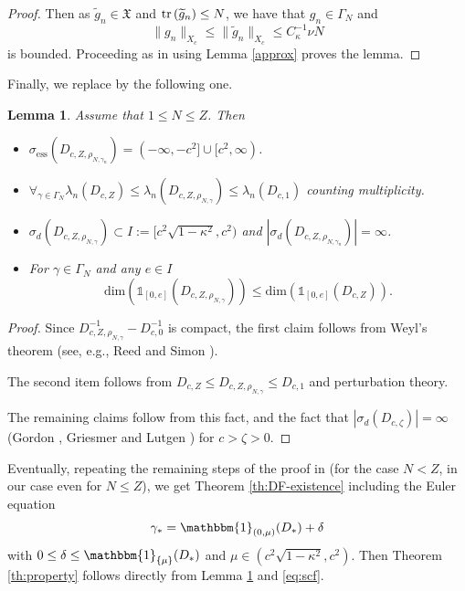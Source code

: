 \documentclass[a4paper]{amsart}
\newtheorem{lemma}{Lemma}
\def\tr{{\rm tr \,}}
\def\1{{\mathds{1}}}
\def\gX{\mathfrak{X}}
\begin{document}
\begin{proof}
Then as $\widetilde{g}_n\in\gX$ and $\tr(\widetilde{g}_n)\leq N$, we
have that $g_n \in \Gamma_{N}$ and
\begin{equation}
    \|g_n\|_{X_c}\leq \|\widetilde{g}_n\|_{X_c}\leq C_{\kappa}^{-1}\nu N
\end{equation}
is bounded. Proceeding as in \cite[Lemma 3.3]{Sere2023} using Lemma
\ref{approx} proves the lemma.
\end{proof}

Finally, we replace \cite[Lemma 3.6]{Sere2023} by the following one.
\begin{lemma}\label{lem:spectral}
    Assume that $1\leq N\leq Z$. Then
    \begin{itemize}
    \item $\sigma_\mathrm{ess}(D_{c,Z, \rho_{N,\gamma_n}})=(-\infty,-c^2]\cup[c^2,\infty)$.
    \item
      $\forall_{\gamma\in \Gamma_N}
      \lambda_n(D_{c,Z})\leq \lambda_n(D_{c,Z,\rho_{N,\gamma}})\leq \lambda_n(D_{c,1})$ counting multiplicity.
          \item
      $\sigma_d(D_{c,Z, \rho_{N,\gamma}})\subset
      I:=[c^2\sqrt{1-\kappa^2},c^2)$ and
      $|\sigma_d(D_{c,Z, \rho_{N,\gamma_n}})|=\infty$.
     \item For $\gamma\in \Gamma_N$ and any $e\in I$
       $$\mathrm{dim}(\1_{[0,e]}(D_{c,Z,\rho_{N,\gamma}}))
       \leq \mathrm{dim}(\1_{[0,e]}(D_{c,Z})).
      $$
    \end{itemize}
\end{lemma}
\begin{proof}
  Since $D_{c,Z,\rho_{N,\gamma}}^{-1}-D_{c,0}^{-1}$ is compact, the
  first claim follows from Weyl's theorem (see, e.g., Reed and Simon
  \cite[Theorem XIII.14]{ReedSimon1978}).

  The second item follows from
  $D_{c,Z}\leq D_{c,Z,\rho_{N,\gamma}}\leq D_{c,1}$ and perturbation
  theory.

  The remaining claims follow from this fact, and the fact that
  $|\sigma_d(D_{c,\zeta})|=\infty$ (Gordon \cite{Gordon1928}, Griesmer
  and Lutgen \cite[Theorem 3 (i)]{GriesemerLutgen1999}) for $c>\zeta>0$.
\end{proof}
Eventually, repeating the remaining steps of the proof in
\cite{Sere2023} (for the case $N<Z$, in our case even for $N\leq Z$),
we get Theorem \ref{th:DF-existence} including the Euler equation
\begin{align}\label{eq:scf}
    \gamma_*=\mathbbm{1}_{(0,\mu)}(D_*)+\delta
\end{align}
with $0\leq \delta \leq \mathbbm{1}_{\{\mu\}}(D_*)$ and
$\mu\in (c^2\sqrt{1-\kappa^2}, c^2)$. Then Theorem \ref{th:property}
follows directly from Lemma \ref{lem:spectral} and \eqref{eq:scf}.
\end{document}
